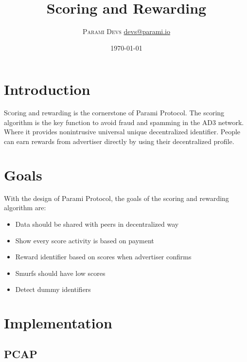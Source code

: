 \documentclass[twoside,twocolumn]{article}
\title{Scoring and Rewarding} %
\author{%
\textsc{Parami Devs} %
\normalsize \href{mailto:devs@parami.io}{devs@parami.io} %
}
\date{\today} %
\begin{document}
\maketitle


\section{Introduction}

\lettrine[nindent=0em,lines=3]{S}coring and rewarding is the cornerstone of Parami Protocol.
The scoring algorithm is the key function to avoid fraud and spamming in the AD3 network.
Where it provides nonintrusive universal unique decentralized identifier.
People can earn rewards from advertiser directly by using their decentralized profile.


\section{Goals}

With the design of Parami Protocol, the goals of the scoring and rewarding algorithm are:
\begin{itemize}
    \item Data should be shared with peers in decentralized way
    \item Show every score activity is based on payment
    \item Reward identifier based on scores when advertiser confirms
    \item Smurfs should have low scores
    \item Detect dummy identifiers
\end{itemize}



\section{Implementation}

\subsection{PCAP}
\end{document}
